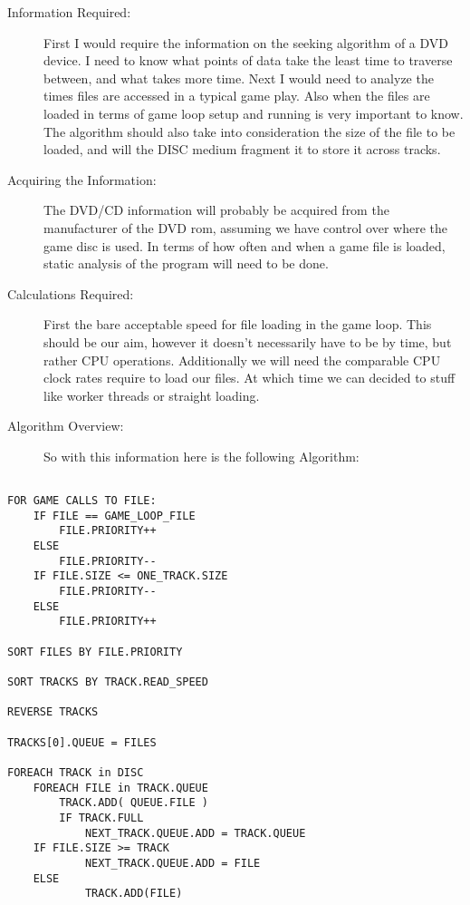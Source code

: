 \documentclass{article}
\begin{document}
\begin{description}
\item[Information Required:]
First I would require the information on the seeking algorithm of a DVD device. I need to know what points of data take the least time to traverse between, and what 
takes more time. Next I would need to analyze the times files are accessed in a typical game play. Also when the files are loaded in terms of game loop setup and running
is very important to know. The algorithm should also take into consideration the size of the file to be loaded, and will the DISC medium fragment it to store it across
tracks.  

\item[Acquiring the Information:]
The DVD/CD information will probably be acquired from the manufacturer of the DVD rom, assuming we have control over where the game disc is used. In terms of how
often and when a game file is loaded, static analysis of the program will need to be done. 
\item[Calculations Required:]
First the bare acceptable speed for file loading in the game loop. This should be our aim, however it doesn't necessarily have to be by time, but rather CPU operations.
Additionally we will need the comparable CPU clock rates require to load our files. At which time we can decided to stuff like worker threads or straight loading.
\item[Algorithm Overview:]
So with this information here is the following Algorithm:
\end{description}

\begin{verbatim}

FOR GAME CALLS TO FILE:
	IF FILE == GAME_LOOP_FILE
	    FILE.PRIORITY++ 
	ELSE
	    FILE.PRIORITY--
	IF FILE.SIZE <= ONE_TRACK.SIZE
	    FILE.PRIORITY--
	ELSE
	    FILE.PRIORITY++

SORT FILES BY FILE.PRIORITY

SORT TRACKS BY TRACK.READ_SPEED

REVERSE TRACKS

TRACKS[0].QUEUE = FILES

FOREACH TRACK in DISC
    FOREACH FILE in TRACK.QUEUE
        TRACK.ADD( QUEUE.FILE )
        IF TRACK.FULL
            NEXT_TRACK.QUEUE.ADD = TRACK.QUEUE
	IF FILE.SIZE >= TRACK
            NEXT_TRACK.QUEUE.ADD = FILE
	ELSE
            TRACK.ADD(FILE)

\end{verbatim}
\end{document}
